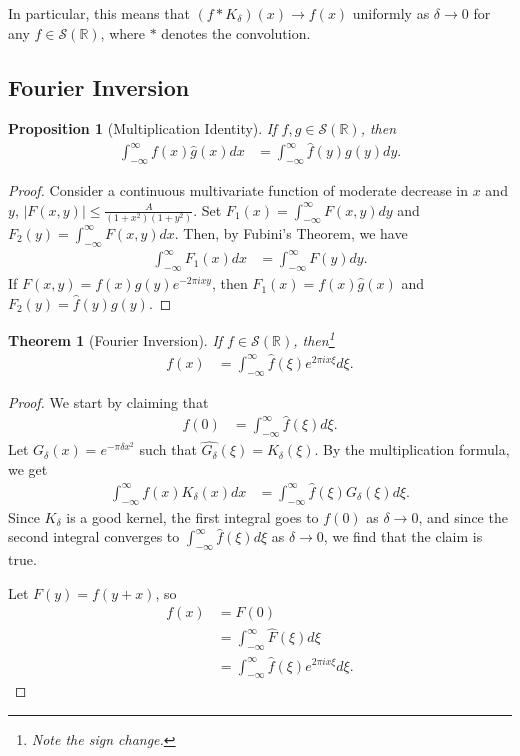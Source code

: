 \documentclass[10pt]{extarticle}
\newcommand{\R}{\mathbb{R}}
\theoremstyle{plain}
\newtheorem*{theorem}{Theorem}%
\newtheorem*{proposition}{Proposition}%
\theoremstyle{definition}
\theoremstyle{remark}
\renewcommand{\newline}{\hfill\break}
\begin{document}
  In particular, this means that $(f\ast K_{\delta})(x) \rightarrow f(x)$ uniformly as $\delta \rightarrow 0$ for any $f\in \mathcal{S}(\R)$, where $\ast$ denotes the convolution.
  \subsection{Fourier Inversion}%
  \begin{proposition}[Multiplication Identity]
    If $f,g\in \mathcal{S}(\R)$, then
    \begin{align*}
      \int_{-\infty}^{\infty}f(x)\hat{g}(x)dx &= \int_{-\infty}^{\infty}\hat{f}(y)g(y)dy.
    \end{align*}
  \end{proposition}
  \begin{proof}
    Consider a continuous multivariate function of moderate decrease in $x$ and $y$, $|F(x,y)| \leq \frac{A}{(1+x^2)(1+y^2)}$. Set $F_1(x) = \int_{-\infty}^{\infty}F(x,y)dy$ and $F_2(y) = \int_{-\infty}^{\infty}F(x,y)dx$. Then, by Fubini's Theorem, we have
    \begin{align*}
      \int_{-\infty}^{\infty}F_1(x)dx &= \int_{-\infty}^{\infty}F(y)dy.
    \end{align*}
    If $F(x,y) = f(x)g(y)e^{-2\pi i x y}$, then $F_1(x) = f(x)\hat{g}(x)$ and $F_2(y) = \hat{f}(y)g(y)$.
  \end{proof}
  \begin{theorem}[Fourier Inversion]
    If $f\in \mathcal{S}(\R)$, then\footnote{Note the sign change.}
    \begin{align*}
      f(x) &= \int_{-\infty}^{\infty}\hat{f}(\xi)e^{2\pi i x \xi}d\xi.
    \end{align*}
  \end{theorem}
  \begin{proof}
    We start by claiming that
    \begin{align*}
      f(0) &= \int_{-\infty}^{\infty}\hat{f}(\xi)d\xi.
    \end{align*}
    Let $G_{\delta}(x) = e^{-\pi \delta x^2}$ such that $\widehat{G_{\delta}}(\xi) = K_{\delta}(\xi)$. By the multiplication formula, we get
    \begin{align*}
      \int_{-\infty}^{\infty}f(x)K_{\delta}(x) dx &= \int_{-\infty}^{\infty}\hat{f}(\xi)G_{\delta}(\xi)d\xi.
    \end{align*}
    Since $K_{\delta}$ is a good kernel, the first integral goes to $f(0)$ as $\delta \rightarrow 0$, and since the second integral converges to $\int_{-\infty}^{\infty}\hat{f}(\xi)d\xi$ as $\delta \rightarrow 0$, we find that the claim is true.\newline

    Let $F(y) = f(y+x)$, so
    \begin{align*}
      f(x) &= F(0)\\
           &= \int_{-\infty}^{\infty}\hat{F}(\xi)d\xi\\
           &= \int_{-\infty}^{\infty}\hat{f}(\xi)e^{2\pi i x \xi}d\xi.
    \end{align*}
  \end{proof}
\end{document}
